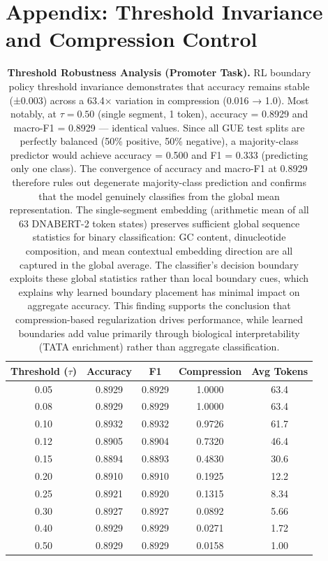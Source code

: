 \documentclass[sigconf,screen]{acmart}
\begin{document}
\section{Appendix: Threshold Invariance and Compression Control}
\begin{table}[!ht]
\centering
\small
\begin{tabular}{ccccc}
\toprule
\textbf{Threshold ($\tau$)} & \textbf{Accuracy} & \textbf{F1} & \textbf{Compression} & \textbf{Avg Tokens} \\
\midrule
0.05 & 0.8929 & 0.8929 & 1.0000 & 63.4 \\
0.08 & 0.8929 & 0.8929 & 1.0000 & 63.4 \\
0.10 & 0.8932 & 0.8932 & 0.9726 & 61.7 \\
0.12 & 0.8905 & 0.8904 & 0.7320 & 46.4 \\
0.15 & 0.8894 & 0.8893 & 0.4830 & 30.6 \\
0.20 & 0.8910 & 0.8910 & 0.1925 & 12.2 \\
0.25 & 0.8921 & 0.8920 & 0.1315 & 8.34 \\
0.30 & 0.8927 & 0.8927 & 0.0892 & 5.66 \\
0.40 & 0.8929 & 0.8929 & 0.0271 & 1.72 \\
0.50 & 0.8929 & 0.8929 & 0.0158 & 1.00 \\
\bottomrule
\end{tabular}
\caption{\textbf{Threshold Robustness Analysis (Promoter Task).} RL boundary policy threshold invariance demonstrates that accuracy remains stable (±0.003) across a 63.4× variation in compression (0.016 → 1.0). Most notably, at $\tau=0.50$ (single segment, 1 token), accuracy = 0.8929 and macro-F1 = 0.8929 — identical values. Since all GUE test splits are perfectly balanced (50\% positive, 50\% negative), a majority-class predictor would achieve accuracy = 0.500 and F1 = 0.333 (predicting only one class). The convergence of accuracy and macro-F1 at 0.8929 therefore rules out degenerate majority-class prediction and confirms that the model genuinely classifies from the global mean representation. The single-segment embedding (arithmetic mean of all 63 DNABERT-2 token states) preserves sufficient global sequence statistics for binary classification: GC content, dinucleotide composition, and mean contextual embedding direction are all captured in the global average. The classifier's decision boundary exploits these global statistics rather than local boundary cues, which explains why learned boundary placement has minimal impact on aggregate accuracy. This finding supports the conclusion that compression-based regularization drives performance, while learned boundaries add value primarily through biological interpretability (TATA enrichment) rather than aggregate classification.}
\label{tab:threshold_robustness}
\end{table}%
\end{document}
